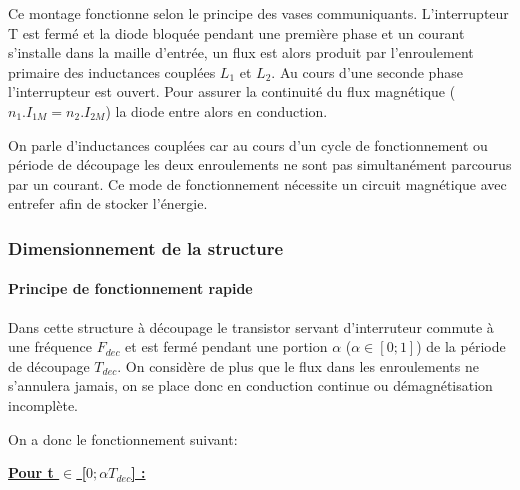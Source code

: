 \documentclass[12pt]{article}
\begin{document}
Ce montage fonctionne selon le principe des vases communiquants. L'interrupteur T est fermé et la diode bloquée pendant une première phase et un courant s'installe dans la maille d'entrée, un flux est alors produit par l'enroulement primaire des inductances couplées $L_1$ et $L_2$. Au cours d'une seconde phase l'interrupteur est ouvert. Pour assurer la continuité du flux magnétique ($n_1.I_{1M} = n_2.I_{2M}$) la diode entre alors en conduction. \par
On parle d'inductances couplées car au cours d'un cycle de fonctionnement ou période de découpage les deux enroulements ne sont pas simultanément parcourus par un courant. Ce mode de fonctionnement nécessite un circuit magnétique avec entrefer afin de stocker l'énergie. \par


\vspace{10pt}

\subsubsection{Dimensionnement de la structure}
\paragraph{Principe de fonctionnement rapide}

Dans cette structure à découpage le transistor servant d'interruteur commute à une fréquence $F_{dec}$ et est fermé pendant une portion $\alpha$ ($\alpha \in [0;1]$) de la période de découpage $T_{dec}$. On considère de plus que le flux dans les enroulements ne s'annulera jamais, on se place donc en conduction continue ou démagnétisation incomplète.  \par
\vspace{10pt}

On a donc le fonctionnement suivant:\par
\vspace{10pt}

\textbf{\underline{Pour t $\in$ [$0;\alpha T_{dec}$] : }}
\end{document}
